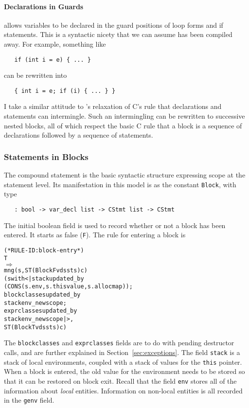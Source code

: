 \documentclass[11pt]{article}
\begin{document}
\paragraph{Declarations in Guards}
\cpp{} allows variables to be declared in the guard positions of loop
forms and if statements.  This is a syntactic nicety that we can assume
has been compiled away.  For example, something like
\begin{verbatim}
   if (int i = e) { ... }
\end{verbatim}
can be rewritten into
\begin{verbatim}
   { int i = e; if (i) { ... } }
\end{verbatim}
I take a similar attitude to \cpp's relaxation of C's rule that
declarations and statements can intermingle.  Such an intermingling
can be rewritten to successive nested blocks, all of which respect the
basic C rule that a block is a sequence of declarations followed by a
sequence of statements.

\subsubsection{Statements in Blocks}
\label{sec:statements-blocks}

The compound statement is the basic syntactic structure expressing
scope at the statement level.  Its manifestation in this model is as
the constant \texttt{Block}, with type
\begin{verbatim}
   : bool -> var_decl list -> CStmt list -> CStmt
\end{verbatim}
The initial boolean field is used to record whether or not a block has
been entered.  It starts as false (\texttt{F}).  The rule for entering
a block is
\begin{center}
\begin{minipage}{\textwidth}
\begin{alltt}
(* RULE-ID: block-entry *)
     T
   \(\Rightarrow\)
     mng (s, ST (Block F vds sts) c)
         (s with <| stack updated_by
                      (CONS (s.env, s.thisvalue, s.allocmap));
                    blockclasses updated_by
                      stackenv_newscope ;
                    exprclasses updated_by
                      stackenv_newscope |>,
          ST (Block T vds sts) c)
\end{alltt}
\end{minipage}
\end{center}
%
%
The \texttt{blockclasses} and \texttt{exprclasses} fields are to do
with pending destructor calls, and are further explained in
Section~\ref{sec:exceptions}.  The field \texttt{stack} is a stack of
local environments, coupled with a stack of values for the
\texttt{this} pointer.  When a block is entered, the old value for
the environment needs to be stored so that it can be restored on block
exit.  Recall that the field \texttt{env} stores all of the
information about \emph{local} entities.  Information on non-local
entities is all recorded in the \texttt{genv} field.
\end{document}
